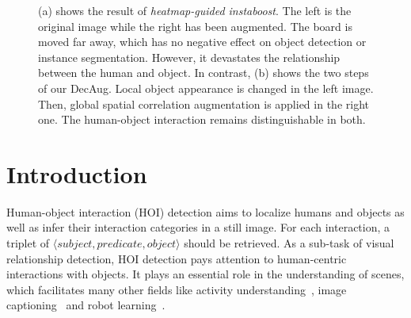 \documentclass[10pt,twocolumn,letterpaper]{article}
\begin{document}
\begin{figure}[t]
\centering
{}

\caption{(a) shows the result of \textit{heatmap-guided instaboost}. The left is the original image while the right has been augmented. The board is moved far away, which has no negative effect on object detection or instance segmentation. However, it devastates the relationship between the human and object. In contrast, (b) shows the two steps of our DecAug. Local object appearance is changed in the left image. Then, global spatial correlation augmentation is applied in the right one. The human-object interaction remains distinguishable in both.
}
\label{fig:drawback}
\end{figure}

\section{Introduction}
Human-object interaction (HOI) detection aims to localize humans and objects as well as infer their interaction categories in a still image. For each interaction, a triplet of $\langle subject, predicate, object\rangle$ should be retrieved. As a sub-task of visual relationship detection, HOI detection pays attention to human-centric interactions with objects. It plays an essential role in the understanding of scenes, which facilitates many other fields like activity understanding~\cite{caba2015activitynet},  image captioning~\cite{li2017scene} and robot learning~\cite{argall2009survey}.
\end{document}
